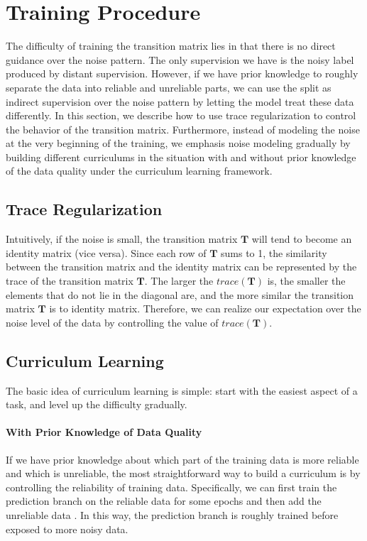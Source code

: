 \section{Training Procedure}
The difficulty of training the transition matrix lies in that there is no direct guidance over the noise pattern. The only supervision we have is the noisy label produced by distant supervision. However, if we have prior knowledge to roughly separate the data into reliable and unreliable parts, we can use the split as indirect supervision over the noise pattern by letting the model treat these data differently. In this section, we describe how to use trace regularization to control the behavior of the transition matrix. Furthermore, instead of modeling the noise at the very beginning of the training, we emphasis noise modeling gradually by building different curriculums in the situation with and without prior knowledge of the data quality under the curriculum learning framework. 

\subsection{Trace Regularization}
Intuitively, if the noise is small, the transition matrix $\mathbf{T}$ will tend to become an identity matrix (vice versa).  Since each row of $\mathbf{T}$ sums to 1, the similarity between the transition matrix and the identity matrix can be represented by the trace of the transition matrix $\mathbf{T}$. The larger the $trace(\mathbf{T})$ is, the smaller the elements that do not lie in the diagonal are, and the more similar the transition matrix $\mathbf{T}$ is to identity matrix. Therefore, we can realize our expectation over the noise level of the data by controlling the value of $trace(\mathbf{T})$.

\subsection{Curriculum Learning}
The basic idea of curriculum learning is simple: start with the easiest aspect of a task, and level up the difficulty gradually.

\paragraph{With Prior Knowledge of Data Quality}
If we have prior knowledge about which part of the training data is more reliable and which is unreliable, the most straightforward way to build a curriculum is by controlling the reliability of training data. Specifically, we can first train the prediction branch on the reliable data for some epochs and then add the unreliable data . In this way, the prediction branch is roughly trained before exposed to more noisy data.

